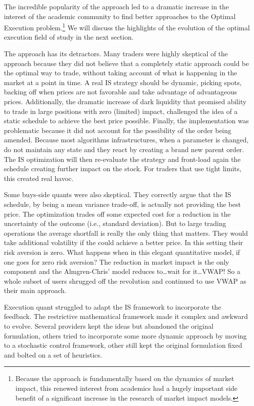The incredible popularity of the approach led to a dramatic increase in the interest of the academic community to find better approaches to the Optimal Execution problem.\footnote{Because the approach is fundamentally based on the dynamics of market impact, this renewed interest from academics had  a hugely important side benefit of a significant increase in the research of market impact models.} We will discuss the highlights of the evolution of the optimal execution field of study in the next section.


The approach has its detractors. Many traders were highly skeptical of the approach because they did not believe that a completely static approach could be the optimal way to trade, without taking account of what is happening in the market at a point in time. A real IS strategy should be dynamic, picking spots, backing off when prices are not favorable and take advantage of advantageous prices.  Additionally, the dramatic increase of dark liquidity that promised ability to trade in large positions with zero (limited) impact, challenged the idea of a static schedule to achieve the best price possible. Finally, the implementation was problematic because it did not account for the possibility of the order being amended. Because most algorithms infrastructures, when a parameter is changed, do not maintain any state and they react by creating a brand new parent order. The IS optimization will then re-evaluate the strategy and front-load again the schedule creating further impact on the stock. For traders that use tight limits, this created real havoc.


Some buys-side quants were also skeptical. They correctly argue that the IS schedule, by being a mean variance trade-off, is actually not providing the best price. The optimization trades off some expected cost for a reduction in the uncertainty of the outcome (i.e., standard deviation). But to large trading operations the average shortfall is really the only thing that matters. They would take additional volatility if the could achieve a better price. In this setting their risk aversion is zero. What happens when in this elegant quantitative model, if one goes for zero risk aversion? The reduction in market impact is the only component and the Almgren-Chris' model reduces to\dots  wait for it\dots VWAP! So a whole subset of users shrugged off the revolution and continued to use VWAP as their main approach.


Execution quant struggled to adapt the IS framework to incorporate the feedback. The restrictive mathematical framework made it complex and awkward to evolve. Several providers kept the ideas but abandoned the original formulation, others tried to incorporate some more dynamic approach by moving to a stochastic control framework, other still kept the original formulation fixed and bolted on a set of heuristics.

